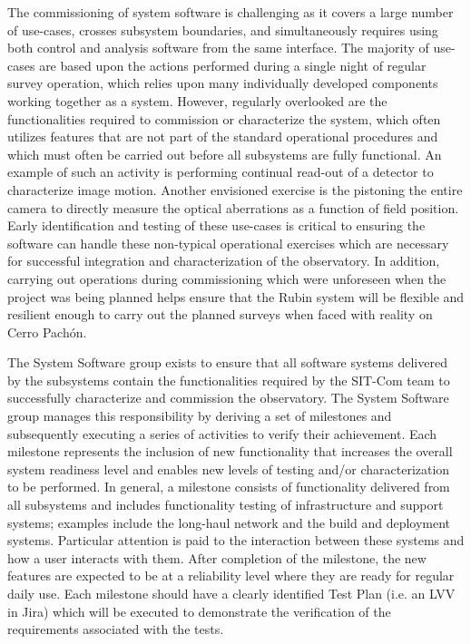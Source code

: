 \documentclass[SE,lsstdraft,authoryear,toc]{lsstdoc}
\begin{document}
The commissioning of system software is challenging as it covers a large number of use-cases, crosses subsystem boundaries, and simultaneously requires using both control and analysis software from the same interface.
The majority of use-cases are based upon the actions performed during a single night of regular survey operation, which relies upon many individually developed components working together as a system.
However, regularly overlooked are the functionalities required to commission or characterize the system, which often utilizes features that are not part of the standard operational procedures and which must often be carried out before all subsystems are fully functional.
An example of such an activity is performing continual read-out of a detector to characterize image motion.
Another envisioned exercise is the pistoning the entire camera to directly measure the optical aberrations as a function of field position.
Early identification and testing of these use-cases is critical to ensuring the software can handle these non-typical operational exercises which are necessary for successful integration and characterization of the observatory.
In addition, carrying out operations during commissioning which were unforeseen when the project was being planned helps ensure that the Rubin system will be flexible and resilient enough to carry out the planned surveys when faced with reality on Cerro Pachón.

The System Software group exists to ensure that all software systems delivered by the subsystems contain the functionalities required by the SIT-Com team to successfully characterize and commission the observatory.
The System Software group manages this responsibility by deriving a set of milestones and subsequently executing a series of activities to verify their achievement. Each milestone represents the inclusion of new functionality that increases the overall system readiness level and enables new levels of testing and/or characterization to be performed.
In general, a milestone consists of functionality delivered from all subsystems and includes functionality testing of infrastructure and support systems; examples include the long-haul network and the build and deployment systems.
Particular attention is paid to the interaction between these systems and how a user interacts with them.
After completion of the milestone, the new features are expected to be at a reliability level where they are ready for regular daily use.
Each milestone should have a clearly identified Test Plan (i.e. an LVV in Jira) which will be executed to demonstrate the verification of the requirements associated with the tests.
\end{document}
